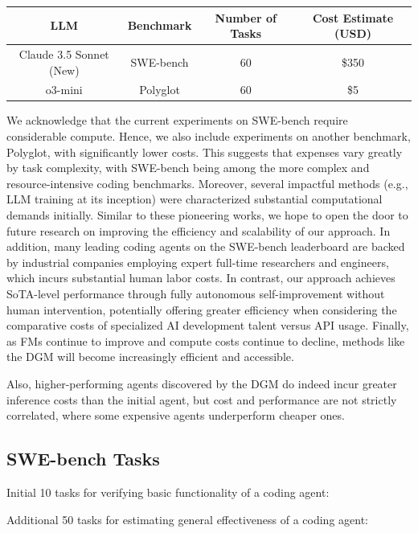 \documentclass{article} %
\begin{document}
\begin{table}[H]
\centering
\begin{tabular}{@{}cccc@{}}
\toprule
\textbf{LLM} & \textbf{Benchmark} & \textbf{Number of Tasks} & \textbf{Cost Estimate (USD)} \\ \midrule
Claude 3.5 Sonnet (New) & SWE-bench & 60 & \$350 \\
o3-mini & Polyglot & 60 & \$5 \\ \bottomrule
\end{tabular}
\end{table}

We acknowledge that the current experiments on SWE-bench require considerable compute. Hence, we also include experiments on another benchmark, Polyglot, with significantly lower costs. This suggests that expenses vary greatly by task complexity, with SWE-bench being among the more complex and resource-intensive coding benchmarks. Moreover, several impactful methods (e.g., LLM training at its inception) were characterized substantial computational demands initially. Similar to these pioneering works, we hope to open the door to future research on improving the efficiency and scalability of our approach. In addition, many leading coding agents on the SWE-bench leaderboard are backed by industrial companies employing expert full-time researchers and engineers, which incurs substantial human labor costs. In contrast, our approach achieves SoTA-level performance through fully autonomous self-improvement without human intervention, potentially offering greater efficiency when considering the comparative costs of specialized AI development talent versus API usage. Finally, as FMs continue to improve and compute costs continue to decline, methods like the DGM will become increasingly efficient and accessible.

Also, higher-performing agents discovered by the DGM do indeed incur greater inference costs than the initial agent, but cost and performance are not strictly correlated, where some expensive agents underperform cheaper ones.

\subsection{SWE-bench Tasks}
\label{app:swebench-tasks}

Initial 10 tasks for verifying basic functionality of a coding agent:


Additional 50 tasks for estimating general effectiveness of a coding agent:

\end{document}
